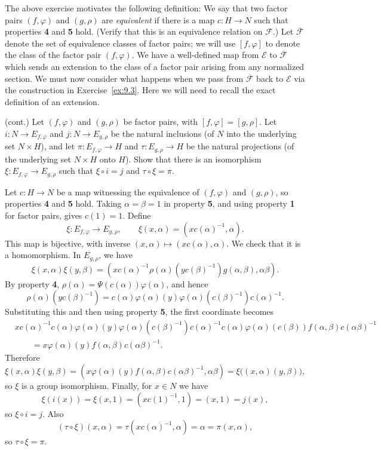 \documentclass[../Odyssey_Project.tex]{subfiles}
\begin{document}
The above exercise motivates the following definition: We say that two factor pairs $(f, \varphi)$ and $(g, \rho)$ are \emph{equivalent} if there is a map $c: H \to N$ such that properties \textbf{4} and \textbf{5} hold. (Verify that this is an equivalence relation on $\mathcal{F}$.) Let $\overline{\mathcal{F}}$ denote the set of equivalence classes of factor pairs; we will use $[f, \varphi]$ to denote the class of the factor pair $(f, \varphi)$. We have a well-defined map from $\mathcal{E}$ to $\overline{\mathcal{F}}$ which sends an extension to the class of a factor pair arising from any normalized section. We must now consider what happens when we pass from $\overline{\mathcal{F}}$ back to $\mathcal{E}$ via the construction in Exercise~\ref{ex:9.3}. Here we will need to recall the exact definition of an extension.

\begin{exercise}
\label{ex:9.5}
(cont.) Let $(f, \varphi)$ and $(g, \rho)$ be factor pairs, with $[f, \varphi] = [g, \rho]$. Let $i: N \to E_{f, \varphi}$ and $j: N \to E_{g, \rho}$ be the natural inclusions (of $N$ into the underlying set $N \times H$), and let $\pi: E_{f, \varphi} \to H$ and $\tau: E_{g, \rho} \to H$ be the natural projections (of the underlying set $N \times H$ onto $H$). Show that there is an isomorphism $\xi: E_{f, \varphi} \to E_{g, \rho}$ such that $\xi \circ i = j$ and $\tau \circ \xi = \pi$.
\end{exercise}
\begin{solution}
Let $c\colon H\to N$ be a map witnessing the equivalence of $(f,\varphi)$ and $(g,\rho)$, so properties \textbf{4} and \textbf{5} hold. Taking $\alpha=\beta=1$ in property \textbf{5}, and using property \textbf{1} for factor pairs, gives $c(1)=1$. Define
\[
    \xi\colon E_{f,\varphi}\to E_{g,\rho},
    \qquad
    \xi(x,\alpha)=(xc(\alpha)^{-1},\alpha).
\]
This map is bijective, with inverse $(x,\alpha)\mapsto (xc(\alpha),\alpha)$. We check that it is a homomorphism. In $E_{g,\rho}$, we have
\[
    \xi(x,\alpha)\xi(y,\beta)
    =
    (xc(\alpha)^{-1}\rho(\alpha)(yc(\beta)^{-1})g(\alpha,\beta),\alpha\beta).
\]
By property \textbf{4}, $\rho(\alpha)=\Psi(c(\alpha))\varphi(\alpha)$, and hence
\[
    \rho(\alpha)(yc(\beta)^{-1})
    =
    c(\alpha)\varphi(\alpha)(y)\varphi(\alpha)(c(\beta)^{-1})c(\alpha)^{-1}.
\]
Substituting this and then using property \textbf{5}, the first coordinate becomes
\[
\begin{aligned}
    &xc(\alpha)^{-1}c(\alpha)\varphi(\alpha)(y)\varphi(\alpha)(c(\beta)^{-1})c(\alpha)^{-1}
    c(\alpha)\varphi(\alpha)(c(\beta))f(\alpha,\beta)c(\alpha\beta)^{-1} \\
    &\qquad
    =
    x\varphi(\alpha)(y)f(\alpha,\beta)c(\alpha\beta)^{-1}.
\end{aligned}
\]
Therefore
\[
    \xi(x,\alpha)\xi(y,\beta)
    =
    (x\varphi(\alpha)(y)f(\alpha,\beta)c(\alpha\beta)^{-1},\alpha\beta)
    =
    \xi\bigl((x,\alpha)(y,\beta)\bigr),
\]
so $\xi$ is a group isomorphism. Finally, for $x\in N$ we have
\[
    \xi(i(x))=\xi(x,1)=(xc(1)^{-1},1)=(x,1)=j(x),
\]
so $\xi\circ i=j$. Also
\[
    (\tau\circ\xi)(x,\alpha)=\tau(xc(\alpha)^{-1},\alpha)=\alpha=\pi(x,\alpha),
\]
so $\tau\circ\xi=\pi$.
\end{solution}
\end{document}
